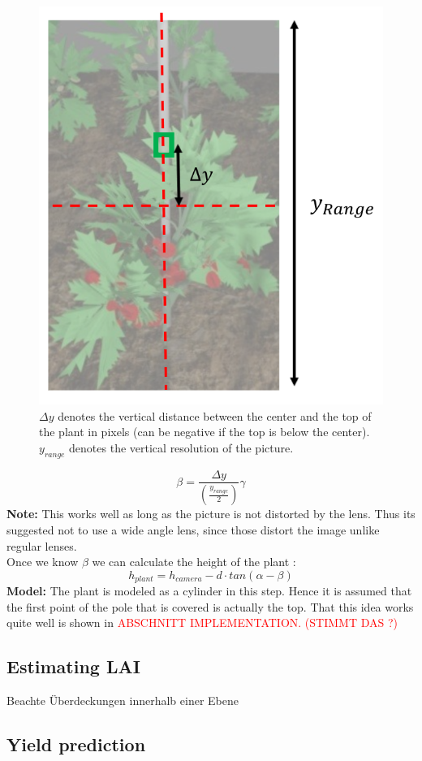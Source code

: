    \begin{figure}[H]
       \centering
       \includegraphics[scale=0.6]{getTopAngle.PNG}
       \caption{$\Delta y$ denotes the vertical distance between the center and the top of the plant in pixels (can be negative if the top is below the center). $y_{range}$ denotes the vertical resolution of the picture.}
       \label{fig:getTopAngle}
   \end{figure}
$$\beta = \frac{\Delta y}{(\frac{y_{range}}{2})}\gamma$$
\textbf{Note:} This works well as long as the picture is not distorted by the lens. Thus its suggested not to use a wide angle lens, since those distort the image unlike regular lenses.\\
Once we know $\beta$ we can calculate the height of the plant :
$$h_{plant} = h_{camera} - d\cdot tan(\alpha - \beta)$$
\textbf{Model:} The plant is modeled as a cylinder in this step. Hence it is assumed that the first point of the pole that is covered is actually the top. That this idea works quite well is shown in \textcolor{red}{ABSCHNITT IMPLEMENTATION. (STIMMT DAS ?)}
\subsection{Estimating LAI}
\label{section:EstLAI}

Beachte Überdeckungen innerhalb einer Ebene
\subsection{Yield prediction}
%
